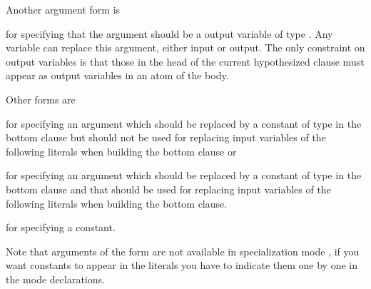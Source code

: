\documentclass[letterpaper,10pt,english]{sphinxmanual}
\begin{document}
Another argument form is

\begin{sphinxVerbatim}[commandchars=\\\{\}]
\end{sphinxVerbatim}

for specifying that the argument should be a output variable of type .
Any variable can replace this argument, either input or output.
The only constraint on output variables is that those in the head of the current hypothesized clause must appear as output variables in an atom of the body.

Other forms are

\begin{sphinxVerbatim}[commandchars=\\\{\}]
\end{sphinxVerbatim}

for specifying an argument which should be replaced by a constant of type  in the bottom clause but should not be used for replacing input variables of the following literals when building the bottom clause or

\begin{sphinxVerbatim}[commandchars=\\\{\}]
\end{sphinxVerbatim}

for specifying an argument which should be replaced by a constant of type  in the bottom clause and that should be used for replacing input variables of the following literals when building the bottom clause.

\begin{sphinxVerbatim}[commandchars=\\\{\}]
\end{sphinxVerbatim}

for specifying a constant.

Note that arguments of the form   are not available in specialization mode , if you want constants to appear in the literals you have to indicate them one by one in the mode declarations.
\end{document}
